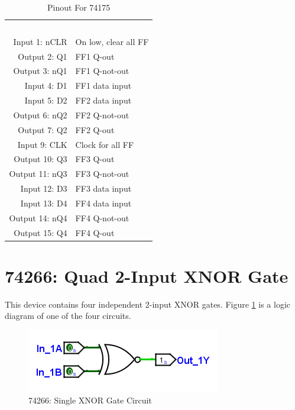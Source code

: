 \begin{table}[H]
	\sffamily
	\newcommand{\head}[1]{\textcolor{white}{\textbf{#1}}}		
	\begin{center}
		\begin{tabular}{rl} 
			\rowcolor{black!75}
			\head{Logisim Label} & \head{Function} \\
			Input 1: nCLR  & On low, clear all FF \\
			Output 2: Q1   & FF1 Q-out            \\
			Output 3: nQ1  & FF1 Q-not-out        \\
			Input 4: D1    & FF1 data input       \\
			Input 5: D2    & FF2 data input       \\
			Output 6: nQ2  & FF2 Q-not-out        \\
			Output 7: Q2   & FF2 Q-out            \\
			Input 9: CLK   & Clock for all FF     \\
			Output 10: Q3  & FF3 Q-out            \\
			Output 11: nQ3 & FF3 Q-not-out        \\
			Input 12: D3   & FF3 data input       \\
			Input 13: D4   & FF4 data input       \\
			Output 14: nQ4 & FF4 Q-not-out        \\
			Output 15: Q4  & FF4 Q-out            \\
		\end{tabular}
	\end{center}
	\caption{Pinout For 74175}
	\label{tab:50-74175}
\end{table}

\section{74266: Quad 2-Input XNOR Gate}

This device contains four independent 2-input XNOR gates. Figure \ref{fig:app_ttl-74266} is a logic diagram of one of the four circuits.

\begin{figure}[H]
	\centering
	\includegraphics{gfx/app_ttl-74266}
	\caption{74266: Single XNOR Gate Circuit}
	\label{fig:app_ttl-74266}
\end{figure}


